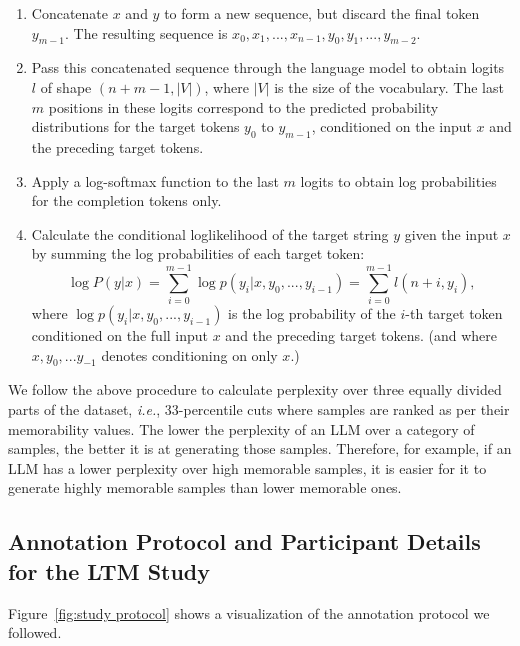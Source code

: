 \begin{enumerate}
    \item Concatenate $x$ and $y$ to form a new sequence, but discard the final token $y_{m-1}$. The resulting sequence is $x_0, x_1, ..., x_{n-1}, y_{0}, y_{1}, ..., y_{m-2}$.
    \item Pass this concatenated sequence through the language model to obtain logits $l$ of shape $(n + m - 1, |V|)$, where $|V|$ is the size of the vocabulary. The last $m$ positions in these logits correspond to the predicted probability distributions for the target tokens $y_0$ to $y_{m-1}$, conditioned on the input $x$ and the preceding target tokens.
    \item Apply a log-softmax function to the last $m$ logits to obtain log probabilities for the completion tokens only.
    \item Calculate the conditional loglikelihood of the target string $y$ given the input $x$ by summing the log probabilities of each target token:
    \begin{equation} \label{eqn:logp}
    \log P(y|x) = \sum_{i=0}^{m-1} \log p(y_{i}|x, y_0, ..., y_{i-1}) = \sum_{i=0}^{m-1} l(n +i, y_i),
    \end{equation} where $\log p(y_i|x, y_0, ..., y_{i-1})$ is the log probability of the $i$-th target token conditioned on the full input $x$ and the preceding target tokens. (and where $x, y_0,... y_{-1}$ denotes conditioning on only $x$.)
\end{enumerate}



We follow the above procedure to calculate perplexity over three equally divided parts of the dataset, \textit{i.e.}, 33-percentile cuts where samples are ranked as per their memorability values. The lower the perplexity of an LLM over a category of samples, the better it is at generating those samples. Therefore, for example, if an LLM has a lower perplexity over high memorable samples, it is easier for it to generate highly memorable samples than lower memorable ones.



\subsection{Annotation Protocol and Participant Details for the LTM Study}
Figure~\ref{fig:study protocol} shows a visualization of the annotation protocol we followed.





